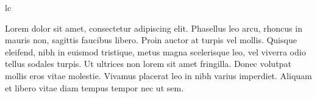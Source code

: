 \documentclass{article}
\begin{document}
lc

\newpage

\beginnumbering
\pstart
{}Lorem  dolor sit amet, consectetur adipiscing elit. Phasellus leo arcu, rhoncus in mauris non, sagittis faucibus libero. Proin auctor at turpis vel mollis. Quisque eleifend, nibh in euismod tristique, metus magna scelerisque leo, vel viverra odio tellus sodales turpis. Ut ultrices non lorem sit amet fringilla. Donec volutpat mollis eros vitae molestie. Vivamus placerat leo in nibh varius imperdiet. Aliquam et libero vitae diam tempus tempor nec ut sem.
\pend
\end{document}
